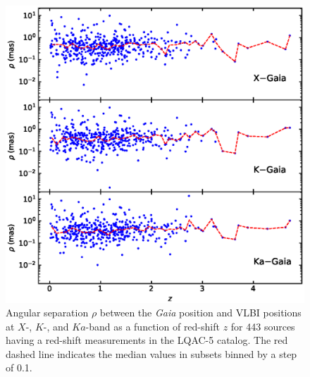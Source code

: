 \documentclass{aa-note}   %
\begin{document}
\begin{figure}[hbtp]
    \centering
    \includegraphics[width=\columnwidth]{figs/rho-z}
    \caption[]{\label{fig:rho-z}
        Angular separation $\rho$ between the {\it Gaia} position and VLBI positions at $X$-, $K$-, and $Ka$-band as a function of red-shift $z$ for 443 sources having a red-shift measurements in the LQAC-5 catalog.
        The red dashed line indicates the median values in subsets binned by a step of 0.1.
    }
\end{figure}
\end{document}
